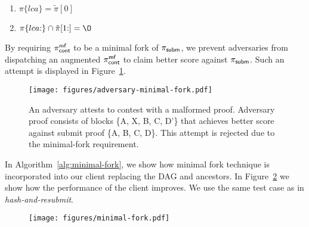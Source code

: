 \begin{enumerate}
\item $\pi\{lca\} = \tilde\pi[0]$
\item $\pi\{lca{:}\} \cap \tilde\pi[1{:}] = \O$
\end{enumerate}

By requiring $\mathsf{\pi_{cont}^{mf}}$ to be a minimal fork of $\mathsf{\pi_{subm}}$, we prevent adversaries
from dispatching an augmented $\mathsf{\pi_{cont}^{mf}}$ to claim better score against $\mathsf{\pi_{subm}}$.
Such an attempt is displayed in Figure~\ref{fig:adversary-minimal-fork}.

\begin{figure}[h]
    \begin{center}
        \texttt{[image: figures/adversary-minimal-fork.pdf]}
    \end{center}

    \caption{An adversary attests to contest with a malformed proof. Adversary
        proof consists of blocks \{A, X, B, C, D'\} that achieves better score
        against submit proof \{A, B, C, D\}. This attempt is rejected due to
        the minimal-fork requirement.}

    \label{fig:adversary-minimal-fork}
\end{figure}

In Algorithm~\ref{alg:minimal-fork}, we show how minimal fork technique is
incorporated into our client replacing the DAG and ancestors. In
Figure~\ref{fig:minimal-fork} we show how the performance of the client
improves. We use the same test case as in \emph{hash-and-resubmit}.



\begin{figure}[h]
    \begin{center}
        \texttt{[image: figures/minimal-fork.pdf]}
    \end{center}
    \caption{}
    \label{fig:minimal-fork}
\end{figure}
